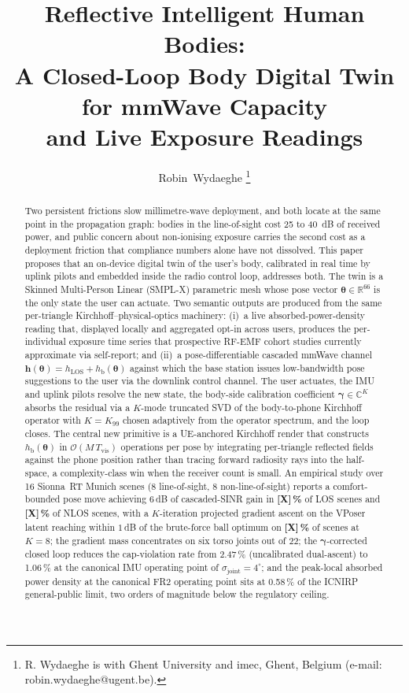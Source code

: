 \documentclass[journal,twocolumn,10pt]{IEEEtran}
\title{Reflective Intelligent Human Bodies:\\
A Closed-Loop Body Digital Twin for mmWave Capacity\\
and Live Exposure Readings}
\author{Robin~Wydaeghe%
  \thanks{R. Wydaeghe is with Ghent University and imec, Ghent, Belgium
  (e-mail: robin.wydaeghe@ugent.be).}}
\theoremstyle{plain}
\theoremstyle{definition}
\theoremstyle{remark}
\newcommand{\hh}{\mathbf{h}}
\newcommand{\thetab}{\bm{\theta}}
\newcommand{\gammab}{\bm{\gamma}}
\newcommand{\hLOS}{h_{\mathrm{LOS}}}
\newcommand{\hbody}{h_{\mathrm{b}}}
\newcommand{\Complex}{\mathbb{C}}
\newcommand{\Reals}{\mathbb{R}}
\begin{document}
\maketitle

\begin{abstract}
Two persistent frictions slow millimetre-wave deployment, and both
locate at the same point in the propagation graph: bodies in the
line-of-sight cost 25 to 40~dB of received power, and public concern
about non-ionising exposure carries the second cost as a deployment
friction that compliance numbers alone have not dissolved. This paper
proposes that an on-device digital twin of the user's body, calibrated
in real time by uplink pilots and embedded inside the radio control
loop, addresses both. The twin is a Skinned Multi-Person Linear (SMPL-X)
parametric mesh whose pose vector $\thetab \in \Reals^{66}$ is the only
state the user can actuate. Two semantic outputs are produced from the
same per-triangle Kirchhoff--physical-optics machinery: (i)~a live
absorbed-power-density reading that, displayed locally and aggregated
opt-in across users, produces the per-individual exposure time series
that prospective RF-EMF cohort studies currently approximate via
self-report; and (ii)~a pose-differentiable cascaded mmWave channel
$\hh(\thetab) = \hLOS + \hbody(\thetab)$ against which the base
station issues low-bandwidth pose suggestions to the user via the
downlink control channel. The user actuates, the IMU and uplink pilots
resolve the new state, the body-side calibration coefficient
$\gammab \in \Complex^{K}$ absorbs the residual via a $K$-mode
truncated SVD of the body-to-phone Kirchhoff operator with
$K = K_{99}$ chosen adaptively from the operator spectrum, and the
loop closes. The central new primitive is a UE-anchored Kirchhoff
render that constructs $\hbody(\thetab)$ in $\mathcal{O}(M\,T_{\mathrm{vis}})$
operations per pose by integrating per-triangle reflected fields against
the phone position rather than tracing forward radiosity rays into the
half-space, a complexity-class win when the receiver count is small.
An empirical study over 16 Sionna~RT Munich scenes (8 line-of-sight,
8 non-line-of-sight) reports a comfort-bounded pose move achieving
$6\,$dB of cascaded-SINR gain in \textbf{[X]\,\%} of LOS scenes and
\textbf{[X]\,\%} of NLOS scenes, with a $K$-iteration projected
gradient ascent on the VPoser latent reaching within $1\,$dB of the
brute-force ball optimum on \textbf{[X]\,\%} of scenes at $K = 8$;
the gradient mass concentrates on six torso joints out of 22; the
$\bm{\gamma}$-corrected closed loop reduces the cap-violation rate
from 2.47\,\% (uncalibrated dual-ascent) to 1.06\,\% at the
canonical IMU operating point of $\sigma_{\mathrm{joint}} =
4^{\circ}$; and the peak-local absorbed power density at the
canonical FR2 operating point sits at 0.58\,\% of the ICNIRP
general-public limit, two orders of magnitude below the regulatory
ceiling.
\end{abstract}
\end{document}
